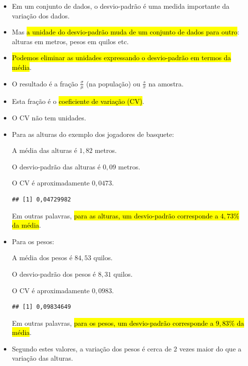 \documentclass[
  11pt]{report}
\newenvironment{Shaded}{\begin{snugshade}}{\end{snugshade}}
\newcommand{\FunctionTok}[1]{\textcolor[rgb]{0.00,0.00,0.00}{#1}}
\newcommand{\NormalTok}[1]{#1}
\newcommand{\SpecialCharTok}[1]{\textcolor[rgb]{0.00,0.00,0.00}{#1}}
\renewenvironment{Shaded}{
    \begin{mdframed}[%
      roundcorner=2pt,%
      innerleftmargin=5pt,%
      innerrightmargin=5pt,%
      topline=true,%
      leftline=true,%
      rightline=true,%
      bottomline=true,%
      linewidth=0.5pt,%
      linecolor=black!20,%
      backgroundcolor=black!2,%
      skipabove=2ex,%
      skipbelow=2.5ex%
    ]%
  }
  {
    \end{mdframed}
  }
\begin{document}
\begin{itemize}
\item
  Em um conjunto de dados, o desvio-padrão é uma medida importante da variação dos dados.
\item
  Mas {\hl{a unidade do desvio-padrão muda de um conjunto de dados para outro}}: alturas em metros, pesos em quilos etc.
\item
  {\hl{Podemos eliminar as unidades expressando o desvio-padrão em termos da média}}.
\item
  O resultado é a fração $\frac{\sigma}{\mu}$ (na população) ou $\frac{s}{\bar x}$ na amostra.
\item
  Esta fração é o {\hl{coeficiente de variação (CV)}}.
\item
  O CV não tem unidades.
\item
  Para as alturas do exemplo dos jogadores de basquete:

  A média das alturas é $1{,}82$ metros.

  O desvio-padrão das alturas é $0{,}09$ metros.

  O CV é aproximadamente $0{,}0473$.

\begin{Shaded}
\end{Shaded}

\begin{verbatim}
## [1] 0,04729982
\end{verbatim}

  Em outras palavras, {\hl{para as alturas, um desvio-padrão corresponde a $4{,}73\%$ da média}}.
\item
  Para os pesos:

  A média dos pesos é $84{,}53$ quilos.

  O desvio-padrão dos pesos é $8{,}31$ quilos.

  O CV é aproximadamente $0{,}0983$.

\begin{Shaded}
\end{Shaded}

\begin{verbatim}
## [1] 0,09834649
\end{verbatim}

  Em outras palavras, {\hl{para os pesos, um desvio-padrão corresponde a $9{,}83\%$ da média}}.
\item
  Segundo estes valores, a variação dos pesos é cerca de $2$ vezes maior do que a variação das alturas.
\end{itemize}
\end{document}
